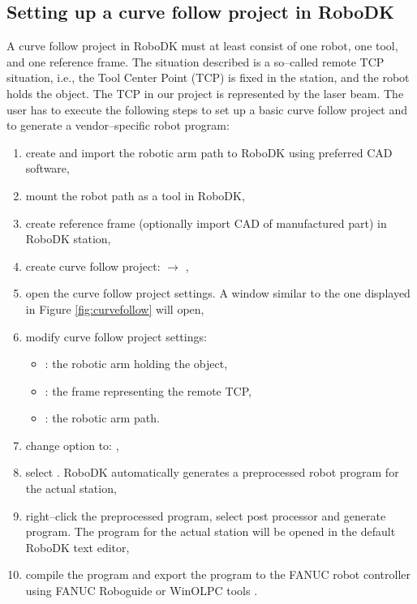 \subsection{Setting up a curve follow project in RoboDK}
\label{sec:settingup}

A curve follow project in RoboDK must at least consist of one robot, one tool, and one reference frame. The situation described is a so--called remote TCP situation, i.e., the Tool Center Point (TCP) is fixed in the station, and the robot holds the object. The TCP in our project is represented by the laser beam. 
The user has to execute the following steps to set up a basic curve follow project and to generate a vendor--specific robot program: 

\begin{enumerate}

\item create and import the robotic arm path to RoboDK using preferred CAD software,

\item mount the robot path as a tool in RoboDK,

\item create reference frame (optionally import CAD of manufactured part) in RoboDK station, 

\item create curve follow project:  $\rightarrow$ ,

\item open the curve follow project settings. A window similar to the one displayed in Figure \ref{fig:curvefollow} will open, 

\item modify curve follow project settings:

    \begin{itemize}

        \item {}: the robotic arm holding the object,
        \item {}: the frame representing the remote TCP,
        \item {}: the robotic arm path.
        
    \end{itemize}
    
\item change  option to: ,

\item select . RoboDK automatically generates a preprocessed robot program for the actual station,

\item right--click the preprocessed program, select post processor and generate program. The  program for the actual station will be opened in the default RoboDK text editor,

\item compile the program and export the program to the FANUC robot controller using FANUC Roboguide or WinOLPC tools \cite{curvefollow}.
    
\end{enumerate}

